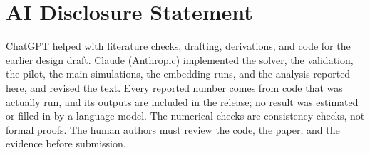 \documentclass{article}
\begin{document}
\section*{AI Disclosure Statement}
ChatGPT helped with literature checks, drafting, derivations, and code for the earlier design draft. Claude (Anthropic) implemented the solver, the validation, the pilot, the main simulations, the embedding runs, and the analysis reported here, and revised the text. Every reported number comes from code that was actually run, and its outputs are included in the release; no result was estimated or filled in by a language model. The numerical checks are consistency checks, not formal proofs. The human authors must review the code, the paper, and the evidence before submission.


\clearpage
\appendix
\onecolumn




\end{document}
